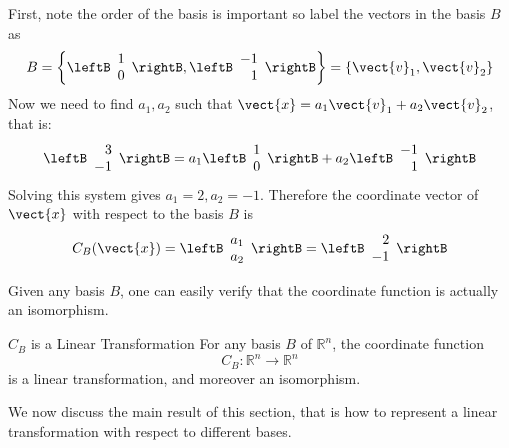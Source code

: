 \begin{solution}
First, note the order of the basis is important so label the vectors in the basis $B$ as 
\[
B = \left\{ \leftB \begin{array}{r}
1 \\
0 
\end{array} \rightB, \leftB \begin{array}{r}
-1 \\
1
\end{array} \rightB \right\} = \left\{ \vect{v}_1, \vect{v}_2 \right\} \]
Now we need to find $a_1, a_2$ such that $\vect{x} = a_1 \vect{v}_1 + a_2 \vect{v}_2$, that is:
\[
\leftB
\begin{array}{r}
3 \\
-1
\end{array}
\rightB
=
a_1 
\leftB \begin{array}{r}
1 \\
0 
\end{array} \rightB
+ a_2
\leftB \begin{array}{r}
-1 \\
1 
\end{array} \rightB\]
Solving this system gives $a_1 = 2, a_2 = -1$. Therefore the coordinate vector of $\vect{x}$ with respect to the basis $B$ is 
\[
C_B(\vect{x})
=
\leftB \begin{array}{r}
a_1 \\
a_2 
\end{array}\rightB
= \leftB \begin{array}{r}
2 \\
-1 
\end{array} \rightB
\]
\end{solution}

Given any basis $B$, one can easily verify that the coordinate function is actually an isomorphism. 

\begin{theorem}{$C_B$ is a Linear Transformation}\label{thm:coordlintransf}
For any basis $B$ of $\mathbb{R}^n$, the coordinate function
\[ C_B: \mathbb{R}^n  \rightarrow \mathbb{R}^n  \]
is a linear transformation, and moreover an isomorphism. 
\end{theorem}

We now discuss the main  result  of this section, that is how
to represent a linear transformation with respect to different
bases.

